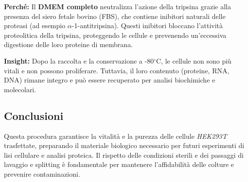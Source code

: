 \begin{percheBox}
\footnotesize{  \textbf{Perché:} Il \textbf{DMEM completo} neutralizza l’azione della tripsina grazie alla presenza del siero fetale bovino (FBS), che contiene inibitori naturali delle proteasi (ad esempio $\alpha$-1-antitripsina). Questi inibitori bloccano l’attività proteolitica della tripsina, proteggendo le cellule e prevenendo un’eccessiva digestione delle loro proteine di membrana.}
\end{percheBox}

\begin{insightBox}
\footnotesize{  \textbf{Insight:} Dopo la raccolta e la conservazione a -80$^\circ$C, le cellule non sono più vitali e non possono proliferare. Tuttavia, il loro contenuto (proteine, RNA, DNA) rimane integro e può essere recuperato per analisi biochimiche e molecolari.}
\end{insightBox}

\subsection{Conclusioni}
Questa procedura garantisce la vitalità e la purezza delle cellule \textit{HEK293T} trasfettate, preparando il materiale biologico necessario per futuri esperimenti di lisi cellulare e analisi proteica. Il rispetto delle condizioni sterili e dei passaggi di lavaggio e splitting è fondamentale per mantenere l’affidabilità delle colture e prevenire contaminazioni.

\newpage
